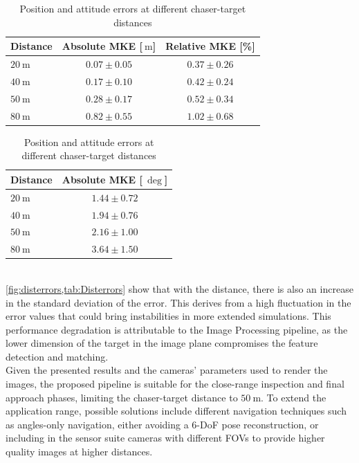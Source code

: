 \begin{table}[h]
    \begin{subtable}[h]{1\textwidth}
        \centering
        \begin{tabular}{l  c c}
        Distance & Absolute MKE [$\SI{}{\meter}$]& Relative MKE [\%]\\ \hline \hline
        $\SI{20}{\meter}$ & $0.07\pm 0.05$ & $0.37\pm 0.26$\\\hline
        $\SI{40}{\meter}$ & $0.17\pm 0.10$ & $0.42\pm 0.24$\\\hline
        $\SI{50}{\meter}$ & $0.28\pm 0.17$ & $0.52\pm 0.34$\\\hline
        $\SI{80}{\meter}$ & $0.82\pm 0.55$ & $1.02\pm 0.68$\\\hline
        
       \end{tabular}
       \caption{Position errors}
       \label{tab:distpos}
    \end{subtable}
    \hfill
    \begin{subtable}[h]{1\textwidth}
        \centering
        \begin{tabular}{l  c }
        Distance & Absolute MKE [$\SI{}{\deg}$]\\ \hline \hline
        $\SI{20}{\meter}$ &  $1.44\pm 0.72$ \\\hline
        $\SI{40}{\meter}$ &  $1.94\pm 0.76$ \\\hline
        $\SI{50}{\meter}$ &  $2.16\pm 1.00$ \\\hline
        $\SI{80}{\meter}$ &  $3.64\pm 1.50$ \\\hline
        \end{tabular}
        \caption{Attitude errors}
        \label{tab:distatt}
     \end{subtable}
     \caption{Position and attitude errors at different chaser-target distances}
     \label{tab:Disterrors}
\end{table}
\mbox{}\\
\cref{fig:disterrors,tab:Disterrors} show that with the distance, there is also an increase in the standard deviation of the error. This derives from a high fluctuation in the error values that could bring instabilities in more extended simulations. 
This performance degradation is attributable to the Image Processing pipeline, as the lower dimension of the target in the image plane compromises the feature detection and matching.\\
Given the presented results and the cameras' parameters used to render the images, the proposed pipeline is suitable for the close-range inspection and final approach phases, limiting the chaser-target distance to $\SI{50}{\meter}$. To extend the application range, possible solutions include different navigation techniques such as angles-only navigation, either avoiding a 6-DoF pose reconstruction, or including in the sensor suite cameras with different FOVs to provide higher quality images at higher distances.


